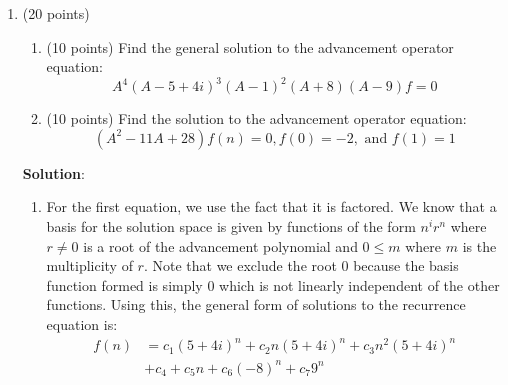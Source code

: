 \documentclass[12pt]{article}
\newenvironment{solution}{
\begin{mdframed}
  { {\bfseries Solution}: }}{
\end{mdframed}}
\begin{document}
\begin{enumerate}
    \pagebreak

    \item (20 points)

    \begin{enumerate}[label=({\alph*})]
      \item (10 points) Find the general solution to the advancement operator equation:
      \begin{equation*}
        A^{4} (A - 5 + 4i)^{3} (A - 1)^{2} (A + 8) (A - 9) f = 0
      \end{equation*}

      \item (10 points) Find the solution to the advancement operator equation:
      \begin{equation*}
        (A^{2} - 11 A + 28) f(n) = 0, f(0) = -2, \text{ and } f(1) = 1
      \end{equation*}
    \end{enumerate}

    \begin{solution}
      \begin{enumerate}[label=({\alph*})]
        \item For the first equation, we use the fact that it is factored.
        We know that a basis for the solution space is given by functions of the form \(n^{i} r^{n}\) where \(r \neq 0\) is a root of the advancement polynomial and \(0 \leq m\) where \(m\) is the multiplicity of \(r\).
        Note that we exclude the root 0 because the basis function formed is simply 0 which is not linearly independent of the other functions.
        Using this, the general form of solutions to the recurrence equation is:
        \begin{align*}
          f(n) &= c_{1} (5 + 4i)^{n} + c_{2} n (5 + 4i)^{n} + c_{3} n^{2} (5 + 4i)^{n} \\
          &+ c_{4} + c_{5} n + c_{6} (-8)^{n} + c_{7} 9^{n}
        \end{align*}


\end{enumerate}
\end{solution}
\end{enumerate}
\end{document}

